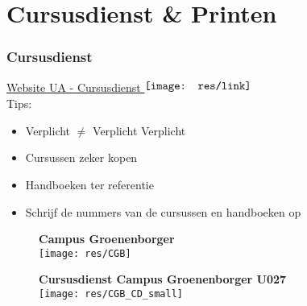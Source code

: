     \section{Cursusdienst \& Printen}
	\begin{frame}[allowframebreaks=10]
		\frametitle{Cursusdienst}
        \href{https://www.uantwerpen.be/nl/onderwijs/studerenuantwerpen/starten-als-student/colleges-cursussen-examens/cursusdienst/}{Website UA - Cursusdienst $\vcenter{\hbox{\texttt{[image: res/link]}}\vspace{0.1cm}}$} \\ \vspace{1cm}
        Tips:
        \begin{itemize}
            \item Verplicht $\neq$ Verplicht Verplicht
            \item Cursussen zeker kopen
            \item Handboeken ter referentie
            \item Schrijf de nummers van de cursussen en handboeken op
		\end{itemize}
        
        
        \framebreak
        \begin{figure}
        	\centering
            \vspace*{0.02cm}
            \textbf{Campus Groenenborger} \\
            \vspace{0.3cm}
        	\texttt{[image: res/CGB]}
        \end{figure}
        \framebreak
        \begin{figure}
        	\centering
            \vspace*{0.02cm}
            \textbf{Cursusdienst Campus Groenenborger U027} \\
            \vspace{0.3cm}
       		\texttt{[image: res/CGB\_CD\_small]}
        \end{figure}
	\end{frame}
    
